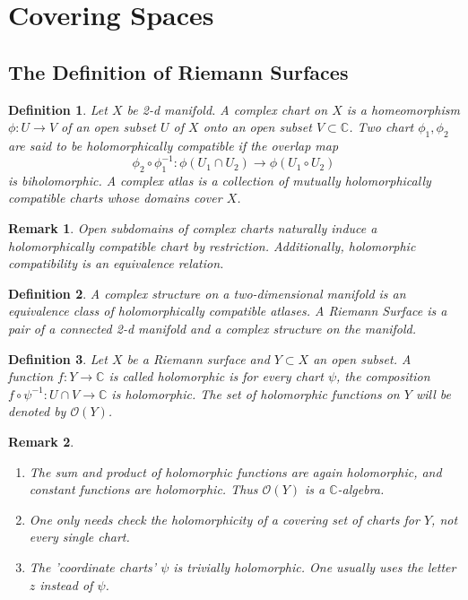 \documentclass{article}
\newtheorem{defn}{Definition}
\newtheorem{rmk}{Remark}
\begin{document}
\section{Covering Spaces}
\subsection{The Definition of Riemann Surfaces}

\begin{defn}

Let $X$ be 2-d manifold. A \textit{complex chart} on $X$ is a homeomorphism $\phi:U \to V$ of an open subset $U$ of $X$ onto an open subset $V \subset \mathbb{C}$. Two chart $\phi_1, \phi_2$ are said to be \textit{holomorphically compatible} if the overlap map 
\[
\phi_2 \circ \phi_1 ^{-1} : \phi(U_1 \cap U_2) \to \phi(U_1 \circ U_2)
\]
is biholomorphic. A \textit{complex atlas} is a collection of mutually holomorphically compatible charts whose domains cover $X$.
\end{defn}

\begin{rmk}

Open subdomains of complex charts naturally induce a  holomorphically compatible chart by restriction. Additionally, holomorphic compatibility is an equivalence relation.

\end{rmk}

\begin{defn}
A \textit{complex structure} on a two-dimensional manifold is an equivalence class of holomorphically compatible atlases. 
\smallskip
A \textit{Riemann Surface} is a pair of a connected 2-d manifold and a complex structure on the manifold.
\end{defn}

\begin{defn}

Let $X$ be a Riemann surface and $Y \subset X$ an open subset. A function $f: Y \to \mathbb{C}$ is called \textit{holomorphic} is for every chart $\psi$, the composition $f \circ \psi^{-1}: U \cap V \to \mathbb{C}$ is holomorphic. The set of holomorphic functions on $Y$ will be denoted by $\mathcal{O}(Y)$.

\end{defn}

\begin{rmk}

\begin{enumerate}
    \item The sum and product of holomorphic functions are again holomorphic, and constant functions are holomorphic. Thus $\mathcal{O}(Y)$ is a $\mathbb{C}$-algebra.
    \item One only needs check the holomorphicity of a covering set of charts for $Y$, not every single chart.
    \item The 'coordinate charts' $\psi$ is trivially holomorphic. One usually uses the letter $z$ instead of $\psi$.
\end{enumerate}

\end{rmk}
\end{document}

